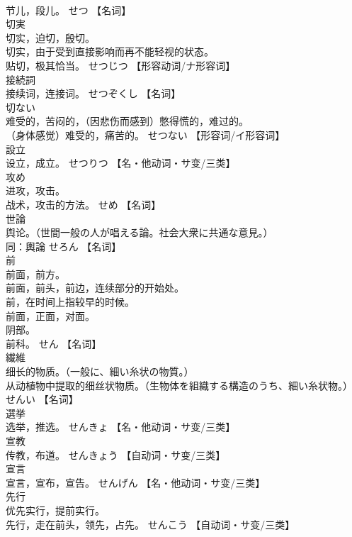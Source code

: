 \documentclass[8pt]{extreport}
\begin{document}
\begin{CJK}{UTF8}{min}
\\	节儿，段儿。	せつ		【名词】
\\	切実	
\\	切实，迫切，殷切。 
\\	切实，由于受到直接影响而再不能轻视的状态。 
\\	贴切，极其恰当。	せつじつ		【形容动词/ナ形容词】
\\	接続詞	
\\	接续词，连接词。	せつぞくし		【名词】
\\	切ない	
\\	难受的，苦闷的，（因悲伤而感到）憋得慌的，难过的。 
\\	（身体感觉）难受的，痛苦的。	せつない		【形容词/イ形容词】
\\	設立	
\\	设立，成立。	せつりつ		【名・他动词・サ变/三类】
\\	攻め	
\\	进攻，攻击。 
\\	战术，攻击的方法。	せめ		【名词】
\\	世論	
\\	舆论。（世間一般の人が唱える論。社会大衆に共通な意見。） 
\\	同：輿論	せろん		【名词】
\\	前	
\\	前面，前方。 
\\	前面，前头，前边，连续部分的开始处。 
\\	前，在时间上指较早的时候。 
\\	前面，正面，对面。 
\\	阴部。 
\\	前科。	せん		【名词】
\\	繊維	
\\	细长的物质。（一般に、細い糸状の物質。） 
\\	从动植物中提取的细丝状物质。（生物体を組織する構造のうち、細い糸状物。）	せんい		【名词】
\\	選挙	
\\	选举，推选。	せんきょ		【名・他动词・サ变/三类】
\\	宣教	
\\	传教，布道。	せんきょう		【自动词・サ变/三类】
\\	宣言	
\\	宣言，宣布，宣告。	せんげん		【名・他动词・サ变/三类】
\\	先行	
\\	优先实行，提前实行。 
\\	先行，走在前头，领先，占先。	せんこう		【自动词・サ变/三类】

\end{CJK}
\end{document}
